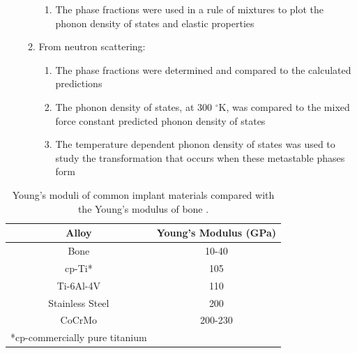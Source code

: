 \begin{enumerate}
\begin{enumerate}
\begin{enumerate}
			\item The phase fractions were used in a rule of mixtures to plot the phonon density of states and elastic properties
		\end{enumerate}
		\item From neutron scattering:
		\begin{enumerate}
			\item The phase fractions were determined and compared to the calculated predictions
			\item The phonon density of states, at 300 $^\circ$K, was compared to the mixed force constant predicted phonon density of states 
			\item The temperature dependent phonon density of states was used to study the transformation that occurs when these metastable phases form
		\end{enumerate}
	\end{enumerate} 
\end{enumerate}
				
\pagebreak
\begin{table}[H]
	\caption{Young's moduli of common implant materials compared with the Young's modulus of bone \cite{Long1998a}.}
	\centering
	\begin{tabular}{ c c }
		\hline
		Alloy & Young's Modulus (GPa) \\
		\hline
		Bone & 10-40\\
		cp-Ti* & 105\\
		Ti-6Al-4V & 110\\
		Stainless Steel & 200\\
		CoCrMo & 200-230\\
		\hline
		*cp-commercially pure titanium 
	\end{tabular}
\label{table:commonEM}
\end{table}
\clearpage


